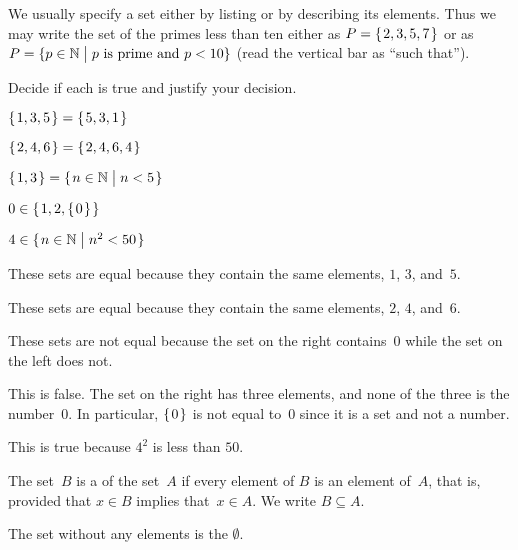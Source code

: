 \documentclass{ibl}  %
\begin{document}
We usually specify a set either by listing or by
describing its elements.
Thus we may write 
the set of the primes less than ten either 
as $P=\mbox{$\{\hspace{0.1em}2, 3, 5, 7\hspace{0.1em}\}$}$ 
or as~$P=\{p\in\mathbb{N} \bigm| \text{$p$ is prime and $p<10$}\}$ 
(read the vertical bar as ``such that'').

\begin{problem}[\midlength] 
Decide if each is true and justify your decision.
\begin{items}
\item $\mbox{$\{\hspace{0.1em}1,3,5\hspace{0.1em}\}$}=\mbox{$\{\hspace{0.1em}5,3,1\hspace{0.1em}\}$}$    
\item $\mbox{$\{\hspace{0.1em}2, 4, 6\hspace{0.1em}\}$}=\mbox{$\{\hspace{0.1em}2, 4, 6, 4\hspace{0.1em}\}$}$    
\item $\mbox{$\{\hspace{0.1em}1, 3\hspace{0.1em}\}$}=\mbox{$\{\hspace{0.1em}n\in\mathbb{N}\bigm| n<5\hspace{0.1em}\}$}$ 
\item $0\in\mbox{$\{\hspace{0.1em}1,2,\mbox{$\{\hspace{0.1em}0\hspace{0.1em}\}$}\hspace{0.1em}\}$}$   
\item $4\in\mbox{$\{\hspace{0.1em}n\in\mathbb{N}\bigm| n^2<50\hspace{0.1em}\}$}$
\end{items}
\begin{answer}
\begin{items}
\item These sets are equal because they contain the same elements, 
  $1$, $3$, and~$5$.
\item These sets are equal because they contain the same elements, 
  $2$, $4$, and~$6$.
\item These sets are not equal because the set on the right contains~$0$
  while the set on the left does not.
\item This is false. 
  The set on the right has three elements, 
  and none of the three is the number~$0$.
  In particular, $\mbox{$\{\hspace{0.1em}0\hspace{0.1em}\}$}$ is not equal to~$0$ since it is a set and
  not a number.
\item This is true because $4^2$ is less than $50$.    
\end{items}
\end{answer}
\end{problem}

\begin{df}
The set~$B$ is a  of the set~$A$
if every element of $B$ is an element of~$A$,
that is, provided that $x\in B$ implies that~$x\in A$.
We write $B\subseteq A$.
\end{df}

\begin{df}
The set without any elements is the  $\emptyset$.  
\end{df}
\end{document}
